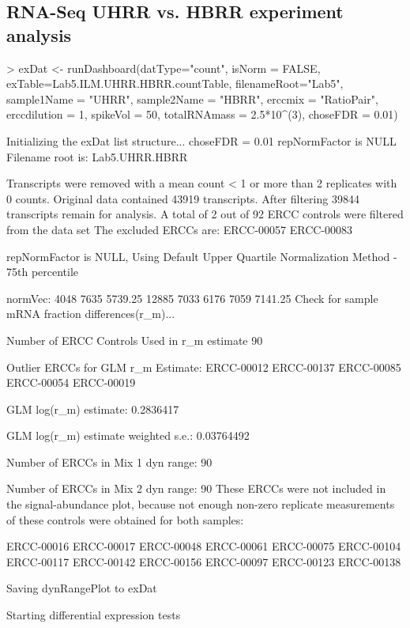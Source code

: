 \documentclass{article}
\begin{document}
\subsection{RNA-Seq UHRR vs. HBRR experiment analysis}
\begin{Schunk}
\begin{Sinput}
> exDat <- runDashboard(datType="count", isNorm = FALSE,
                        exTable=Lab5.ILM.UHRR.HBRR.countTable,
                        filenameRoot="Lab5", sample1Name = "UHRR", 
                        sample2Name = "HBRR", erccmix = "RatioPair",
                        erccdilution = 1, spikeVol = 50, 
                        totalRNAmass = 2.5*10^(3), choseFDR = 0.01)
\end{Sinput}
\begin{Soutput}
Initializing the exDat list structure...
choseFDR = 0.01 
repNormFactor is NULL 
Filename root is: Lab5.UHRR.HBRR 

Transcripts were removed with a mean count < 1 or more than 2 
replicates with 0 counts.
Original data contained  43919 transcripts. 
After filtering  39844 transcripts remain for  analysis.
A total of 2 out of 92 
ERCC controls were filtered from the data set
The excluded ERCCs are:
ERCC-00057 ERCC-00083

repNormFactor is NULL,
 Using Default Upper Quartile Normalization Method  - 75th percentile

normVec:
4048 7635 5739.25 12885 7033 6176 7059 7141.25
Check for sample mRNA fraction differences(r_m)...

Number of ERCC Controls Used in r_m estimate
90 

Outlier ERCCs for GLM r_m Estimate:
ERCC-00012 ERCC-00137 ERCC-00085 ERCC-00054 ERCC-00019

GLM log(r_m) estimate:
0.2836417 

GLM log(r_m) estimate weighted s.e.:
0.03764492 

Number of ERCCs in Mix 1 dyn range:  90 

Number of ERCCs in Mix 2 dyn range:  90 
These ERCCs were not included in the signal-abundance plot,
because not enough non-zero replicate measurements of these 
controls were obtained for both samples:

ERCC-00016 ERCC-00017 ERCC-00048 ERCC-00061 ERCC-00075
ERCC-00104 ERCC-00117 ERCC-00142 ERCC-00156 ERCC-00097
ERCC-00123 ERCC-00138


Saving dynRangePlot to exDat

Starting differential expression tests


\end{Soutput}
\end{Schunk}
\end{document}
